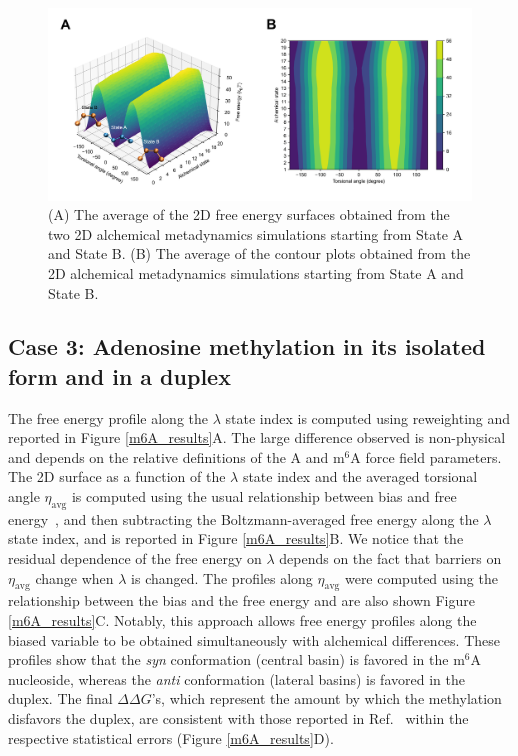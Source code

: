 \documentclass[journal=jacsat,manuscript=article]{achemso}
\begin{document}
\begin{figure}[H]
    \centering
    \includegraphics[width=\textwidth]{Figures/sys2_fes_contour_avg_annotated.png}   
    \caption{(A) The average of the 2D free energy surfaces obtained from the two 2D alchemical metadynamics simulations starting from State A and State B. (B) The average of the contour plots obtained from the 2D alchemical metadynamics simulations starting from State A and State B.}
    \label{sys2_fes_contour}
\end{figure}

\subsection{Case 3: Adenosine methylation in its isolated form and in a duplex}
The free energy profile along the $\lambda$ state index is computed using reweighting and reported in Figure \ref{m6A_results}A. The large difference observed is non-physical and depends on the relative definitions of the A and m$^6$A force field parameters. The 2D surface as a function of the $\lambda$ state index and the averaged torsional angle $\eta_{\text{avg}}$ is computed using the usual relationship between bias and free energy~\cite{WTMetaD}, and then subtracting the Boltzmann-averaged free energy along the $\lambda$ state index, and is reported in Figure \ref{m6A_results}B. We notice that the residual dependence of the free energy on $\lambda$ depends on the fact that barriers on $\eta_{\text{avg}}$ change when $\lambda$ is changed. The profiles along $\eta_{\text{avg}}$ were computed using the relationship between the bias and the free energy and are also shown Figure \ref{m6A_results}C. Notably, this approach allows free energy profiles along the biased variable to be obtained simultaneously with alchemical differences. These profiles show that the \emph{syn} conformation (central basin) is favored in the m$^6$A nucleoside, whereas the \emph{anti} conformation (lateral basins) is favored in the duplex. The final $\Delta \Delta G$'s, which represent the amount by which the methylation disfavors the duplex, are consistent with those reported in Ref.~\cite{piomponi2022molecular} within the respective statistical errors (Figure \ref{m6A_results}D).
\end{document}
